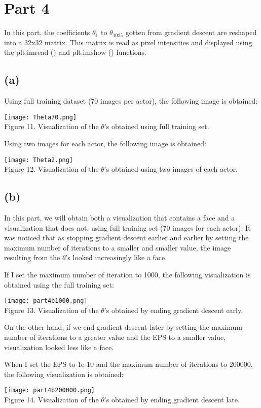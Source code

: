\documentclass{article}
\begin{document}
\newpage
\section*{Part 4}
In this part, the coefficients $\theta_{1}$ to $\theta_{1025}$ gotten from gradient descent are reshaped into a 32x32 matrix. This matrix is read as pixel intensities and displayed using the plt.imread () and plt.imshow () functions.
\subsection*{(a)}
Using full training dataset (70 images per actor), the following image is obtained:
\begin{center}
\texttt{[image: Theta70.png]}\\
Figure 11. Visualization of the $\theta$'s obtained using full training set.
\end{center}


Using two images for each actor, the following image is obtained:

\begin{center}
\texttt{[image: Theta2.png]}\\
Figure 12. Visualization of the $\theta$'s obtained using two images of each actor.
\end{center}

\newpage
\subsection*{(b)}
In this part, we will obtain both a visualization that contains a face and a visualization that does not, using full training set (70 images for each actor). 
It was noticed that as stopping gradient descent earlier and earlier by setting the maximum number of iterations to a smaller and smaller value, the image resulting from the $\theta$'s looked increasingly like a face. 
\par If I set the maximum number of iteration to 1000, the following visualization is obtained using the full training set:
\begin{center}
\texttt{[image: part4b1000.png]}\\
Figure 13. Visualization of the $\theta$'s obtained by ending gradient descent early. 
\end{center}
\par On the other hand, if we end gradient descent later by setting the maximum number of iterations to a greater value and the EPS to a smaller value, visualization looked less like a face.
\par When I set the EPS to 1e-10 and the maximum number of iterations to 200000, the following visualization is obtained:
\begin{center}
\texttt{[image: part4b200000.png]}\\
Figure 14. Visualization of the $\theta$'s obtained by ending gradient descent late. 
\end{center}
\end{document}
